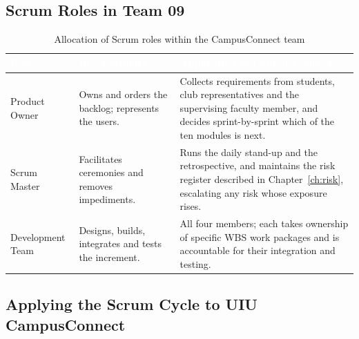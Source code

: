 \documentclass[11pt,a4paper]{report}
\newcommand{\thead}[1]{\textcolor{white}{\sffamily\bfseries #1}}
\newcommand{\rowhead}{\rowcolor{headRow}}
\begin{document}
\subsection{Scrum Roles in Team 09}

\begin{table}[htbp]
\centering
\caption{Allocation of Scrum roles within the CampusConnect team}
\label{tab:roles}
\begin{tabular}{|L{3.4cm}|L{5.0cm}|L{6.0cm}|}
\hline
\rowhead \thead{Role} & \thead{Responsibility} & \thead{Application in CampusConnect} \\ \hline
Product Owner & Owns and orders the backlog; represents the users. &
Collects requirements from students, club representatives and the supervising
faculty member, and decides sprint-by-sprint which of the ten modules is next. \\ \hline
{}
Scrum Master & Facilitates ceremonies and removes impediments. &
Runs the daily stand-up and the retrospective, and maintains the risk register
described in Chapter~\ref{ch:risk}, escalating any risk whose exposure rises. \\ \hline
Development Team & Designs, builds, integrates and tests the increment. &
All four members; each takes ownership of specific WBS work packages and is
accountable for their integration and testing. \\ \hline
\end{tabular}
\end{table}

\subsection{Applying the Scrum Cycle to UIU CampusConnect}
\end{document}
